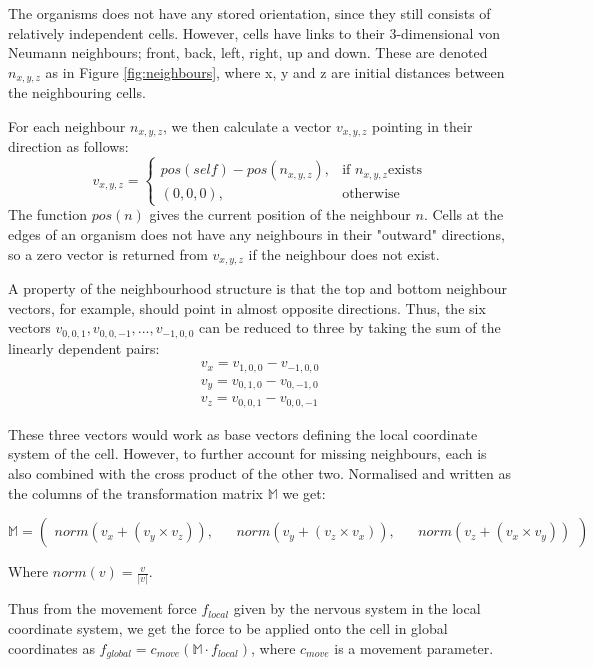The organisms does not have any stored orientation, since they still consists of relatively independent cells. However, cells have links to their 3-dimensional von Neumann neighbours; front, back, left, right, up and down. These are denoted \(n_{x,y,z}\) as in Figure \ref{fig:neighbours}, where x, y and z are initial distances between the neighbouring cells.

For each neighbour \(n_{x,y,z}\), we then calculate a vector \(v_{x,y,z}\) pointing in their direction as follows:
\[
v_{x,y,z} = 
\begin{cases}
pos(self) - pos(n_{x,y,z}), & \text{if }n_{x,y,z} \text{exists}\\
(0,0,0), & \text{otherwise}
\end{cases}
\]
The function \(pos(n)\) gives the current position of the neighbour \(n\).
Cells at the edges of an organism does not have any neighbours in their "outward" directions, so a zero vector is returned from \(v_{x,y,z}\) if the neighbour does not exist. 

A property of the neighbourhood structure is that the top and bottom neighbour vectors, for example, should point in almost opposite directions. Thus, the six vectors \(v_{0,0,1}, v_{0,0,-1}, ..., v_{-1,0,0}\) can be reduced to three by taking the sum of the linearly dependent pairs:
\begin{align*}
v_x = v_{1,0,0} - v_{-1,0,0}\\
v_y = v_{0,1,0} - v_{0,-1,0}\\
v_z = v_{0,0,1} - v_{0,0,-1}
\end{align*}

These three vectors would work as base vectors defining the local coordinate system of the cell. However, to further account for missing neighbours, each is also combined with the cross product of the other two. Normalised and written as the columns of the transformation matrix \(\mathbb{M}\) we get:

\[
\mathbb{M}=
\left(
\begin{matrix}
 norm(v_x + (v_y \times v_z)), &&
 norm(v_y + (v_z \times v_x)), &&
 norm(v_z + (v_x \times v_y))
\end{matrix}
\right)
\]

Where \(norm(v) = \frac{v}{|v|}\).

Thus from the movement force \(f_{local}\) given by the nervous system in the local coordinate system, we get the force to be applied onto the cell in global coordinates as \(f_{global} = 
c_{move}(\mathbb{M} \cdot f_{local} ) \), where \(c_{move}\) is a movement parameter.


